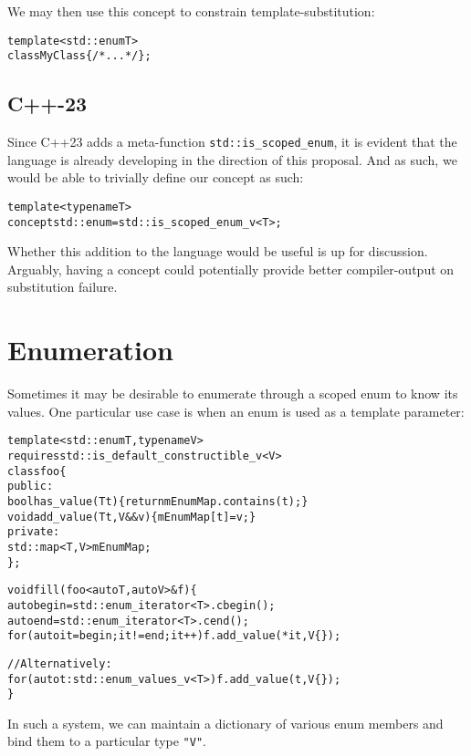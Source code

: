 \documentclass[a4paper, 12pt]{article}
\begin{document}
\noindent
We may then use this concept to constrain template-substitution:

\begin{alltt}\footnotesize
template<std::enum T>
class MyClass \{ /* ... */ \};
\end{alltt}

\subsection{C++-23}

Since C++23 adds a meta-function \texttt{std::is\_scoped\_enum}, it is
evident that the language is already developing in the direction of this
proposal. And as such, we would be able to trivially define our concept as
such:

\begin{alltt}\footnotesize
template<typename T>
concept std::enum = std::is\_scoped\_enum\_v<T>;
\end{alltt}

\noindent
Whether this addition to the language would be useful is up for discussion.
Arguably, having a concept could potentially provide better compiler-output
on substitution failure.



\section{Enumeration}

Sometimes it may be desirable to enumerate through a scoped enum to know its
values. One particular use case is when an enum is used as a template parameter:

\begin{alltt}\footnotesize
template<std::enum T, typename V>
requires std::is\_default\_constructible\_v<V>
class foo \{
public:
  bool has\_value(T t) \{ return mEnumMap.contains(t); \}
  void add\_value(T t, V&& v) \{ mEnumMap[t] = v; \}
private:
  std::map<T, V> mEnumMap;
\};

void fill(foo<auto T, auto V>& f) \{
  auto begin = std::enum\_iterator<T>.cbegin();
  auto end = std::enum\_iterator<T>.cend();
  for (auto it = begin; it != end; it++) { f.add\_value(*it, V\{\}); }

  // Alternatively:
  for (auto t : std::enum\_values\_v<T>) { f.add\_value(t, V\{\}); }
\}
\end{alltt}

In such a system, we can maintain a dictionary of various enum members and bind
them to a particular type \texttt{"V"}.
\end{document}

